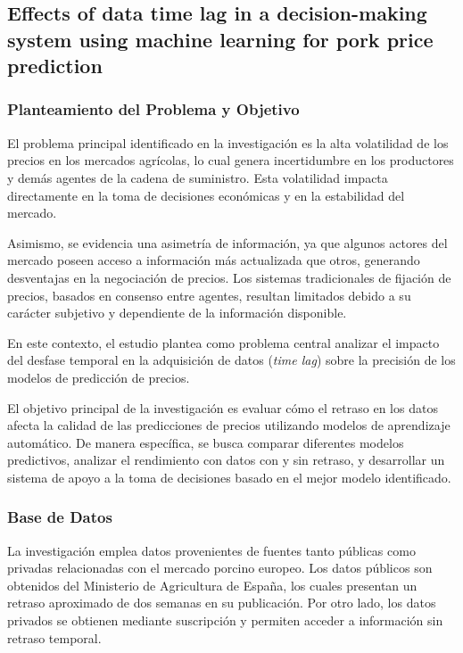 \subsection{Effects of data time lag in a decision-making system using machine learning for pork price prediction \citep{suaza2023pork} }


\subsubsection{Planteamiento del Problema y Objetivo}

El problema principal identificado en la investigación es la alta volatilidad de los precios en los mercados agrícolas, lo cual genera incertidumbre en los productores y demás agentes de la cadena de suministro. Esta volatilidad impacta directamente en la toma de decisiones económicas y en la estabilidad del mercado.

Asimismo, se evidencia una asimetría de información, ya que algunos actores del mercado poseen acceso a información más actualizada que otros, generando desventajas en la negociación de precios. Los sistemas tradicionales de fijación de precios, basados en consenso entre agentes, resultan limitados debido a su carácter subjetivo y dependiente de la información disponible.

En este contexto, el estudio plantea como problema central analizar el impacto del desfase temporal en la adquisición de datos (\textit{time lag}) sobre la precisión de los modelos de predicción de precios.

El objetivo principal de la investigación es evaluar cómo el retraso en los datos afecta la calidad de las predicciones de precios utilizando modelos de aprendizaje automático. De manera específica, se busca comparar diferentes modelos predictivos, analizar el rendimiento con datos con y sin retraso, y desarrollar un sistema de apoyo a la toma de decisiones basado en el mejor modelo identificado.

\subsubsection{Base de Datos}

La investigación emplea datos provenientes de fuentes tanto públicas como privadas relacionadas con el mercado porcino europeo. Los datos públicos son obtenidos del Ministerio de Agricultura de España, los cuales presentan un retraso aproximado de dos semanas en su publicación. Por otro lado, los datos privados se obtienen mediante suscripción y permiten acceder a información sin retraso temporal.

